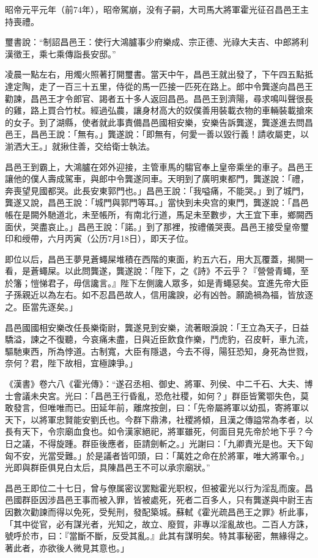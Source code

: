 昭帝元平元年（前74年），昭帝駕崩，没有子嗣，大司馬大將軍霍光征召昌邑王主持喪禮。

璽書說：“制詔昌邑王：使行大鴻臚事少府樂成、宗正德、光祿大夫吉、中郎將利漢徵王，乘七乘傳詣長安邸。”

凌晨一點左右，用燭火照著打開璽書。當天中午，昌邑王就出發了，下午四五點抵達定陶，走了一百三十五里，侍從的馬一匹接一匹死在路上。郎中令龔遂向昌邑王勸諫，昌邑王才令郎官、謁者五十多人返回昌邑。昌邑王到濟陽，尋求鳴叫聲很長的雞，路上買合竹杖。經過弘農，讓身材高大的奴僕善用裝載衣物的車輛裝載搶來的女子。到了湖縣，使者就此事責備昌邑國相安樂，安樂告訴龔遂，龔遂進去問昌邑王，昌邑王說：「無有。」龔遂說：「即無有，何愛一善以毀行義！請收屬吏，以湔洒大王。」就揪住善，交给衛士執法。

昌邑王到霸上，大鴻臚在郊外迎接，主管車馬的騶官奉上皇帝乘坐的車子。昌邑王讓他的僕人壽成駕車，與郎中令龔遂同車。天明到了廣明東都門，龔遂說：「禮，奔喪望見國都哭。此長安東郭門也。」昌邑王說：「我嗌痛，不能哭。」到了城門，龔遂又說，昌邑王說：「城門與郭門等耳。」當快到未央宫的東門，龔遂說：「昌邑帳在是闕外馳道北，未至帳所，有南北行道，馬足未至數步，大王宜下車，鄉闕西面伏，哭盡哀止。」昌邑王說：「諾。」到了那裡，按禮儀哭喪。昌邑王接受皇帝璽印和绶帶，六月丙寅（公历7月18日），即天子位。

即位以后，昌邑王夢見蒼蠅屎堆積在西階的東面，約五六石，用大瓦覆蓋，揭開一看，是蒼蠅屎。以此問龔遂，龔遂說：「陛下，之《詩》不云乎？『營營青蠅，至於籓；愷悌君子，毋信讒言。』陛下左側讒人眾多，如是青蠅惡矣。宜進先帝大臣子孫親近以為左右。如不忍昌邑故人，信用讒諛，必有凶咎。願詭禍為福，皆放逐之。臣當先逐矣。」

昌邑國國相安樂改任長樂衛尉，龔遂見到安樂，流著眼淚說：「王立為天子，日益驕溢，諫之不復聽，今哀痛未盡，日與近臣飲食作樂，鬥虎豹，召皮軒，車九流，驅馳東西，所為悖道。古制寬，大臣有隱退，今去不得，陽狂恐知，身死為世戮，奈何？君，陛下故相，宜極諫爭。」

《漢書》卷六八《霍光傳》：“遂召丞相、御史、將軍、列侯、中二千石、大夫、博士會議未央宮。光曰：「昌邑王行昏亂，恐危社稷，如何？」群臣皆驚鄂失色，莫敢發言，但唯唯而已。田延年前，離席按劍，曰：「先帝屬將軍以幼孤，寄將軍以天下，以將軍忠賢能安劉氏也。今群下鼎沸，社稷將傾，且漢之傳謚常為孝者，以長有天下，令宗廟血食也。如令漢家絕祀，將軍雖死，何面目見先帝於地下乎？今日之議，不得旋踵。群臣後應者，臣請劍斬之。」光謝曰：「九卿責光是也。天下匈匈不安，光當受難。」於是議者皆叩頭，曰：「萬姓之命在於將軍，唯大將軍令。」光即與群臣俱見白太后，具陳昌邑王不可以承宗廟狀。”

昌邑王即位二十七日，曾与僚属密议罢黜霍光职权，但被霍光以行为淫乱而废。昌邑國群臣因涉昌邑王事而被入罪，皆被處死，死者二百多人，只有龔遂與中尉王吉因數次勸諫而得以免死，受髡刑，發配築城。蘇軾《霍光疏昌邑王之罪》析此事，「其中從官，必有謀光者，光知之，故立、廢賀，非專以淫亂故也。二百人方誅，號呼於市，曰：『當斷不斷，反受其亂。』此其有謀明矣。特其事秘密，無緣得之。著此者，亦欲後人微見其意也。」


